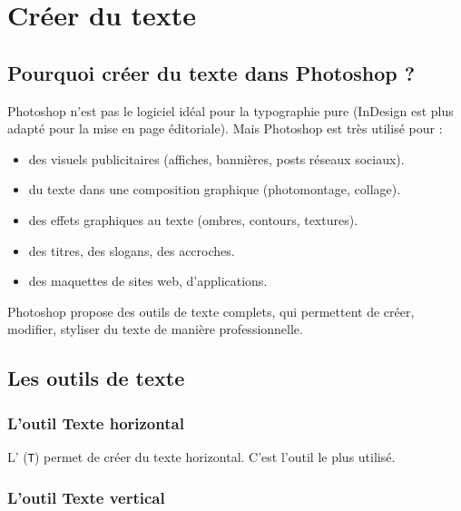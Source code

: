 \section{Créer du texte}

\subsection{Pourquoi créer du texte dans Photoshop ?}

Photoshop n'est pas le logiciel idéal pour la typographie pure (InDesign est plus adapté pour la mise en page éditoriale). Mais Photoshop est très utilisé pour :

\begin{itemize}
    \item {} des visuels publicitaires (affiches, bannières, posts réseaux sociaux).
    \item {} du texte dans une composition graphique (photomontage, collage).
    \item {} des effets graphiques au texte (ombres, contours, textures).
    \item {} des titres, des slogans, des accroches.
    \item {} des maquettes de sites web, d'applications.
\end{itemize}

Photoshop propose des outils de texte complets, qui permettent de créer, modifier, styliser du texte de manière professionnelle.

\subsection{Les outils de texte}

\subsubsection{L'outil Texte horizontal}

L' (\texttt{T}) permet de créer du texte horizontal. C'est l'outil le plus utilisé.

\subsubsection{L'outil Texte vertical}

